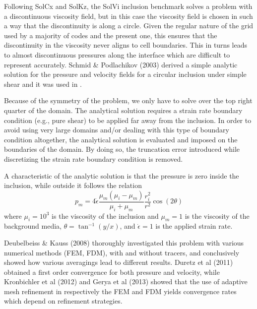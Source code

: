 

Following SolCx and SolKz, the SolVi inclusion benchmark solves 
a problem with a discontinuous viscosity field, but in this case 
the viscosity field is chosen in such a way that the discontinuity 
is along a circle. Given the regular nature of the grid used by a majority of codes and the present one, 
this ensures that the discontinuity in the viscosity never aligns to cell boundaries.
This in turns leads to almost discontinuous pressures along the interface which are difficult to represent accurately.
Schmid \& Podlachikov (2003) \cite{scpo03} derived a simple analytic solution for the pressure and 
velocity fields for a circular 
inclusion under simple shear and it was used in \cite{deka08,sunh10,dumg11,krhb12,gemd13}.

Because of the symmetry of the problem, we only have to solve over the top right quarter of the domain.
The analytical solution requires a strain rate boundary condition (e.g., pure shear) to be applied far away 
from the inclusion. In order to avoid using very large domains and/or dealing with this type of boundary condition 
altogether, the analytical solution is evaluated and imposed on the boundaries of the domain. 
By doing so, the truncation error introduced while discretizing the strain rate boundary condition is removed.

A characteristic of the analytic solution is that the pressure is zero inside the inclusion, while outside it follows the relation
\begin{equation}
p_m = 4 \dot{\epsilon}
\frac{\mu_m(\mu_i-\mu_m)}{\mu_i+\mu_m}
\frac{r_i^2}{r^2} \cos(2\theta)
\end{equation}
where $\mu_i = 10^3$ is the viscosity of the inclusion and $\mu_m = 1$ is the viscosity of the background media, $\theta=\tan^{-1}(y/x)$,
and $\dot{\epsilon}=1$ is the applied strain rate.

Deubelbeiss \& Kauss (2008) \cite{deka08} thoroughly investigated this problem with various 
numerical methods (FEM, FDM), with and without tracers, 
and conclusively showed how various averagings lead to different results. 
Duretz et al (2011) \cite{dumg11} obtained a first order convergence for both pressure and velocity, 
while Kronbichler et al (2012) \cite{krhb12}
and Gerya et al (2013) \cite{gemd13} showed that the use of adaptive mesh refinement in respectively the FEM and FDM 
yields convergence rates which depend on refinement strategies. 

